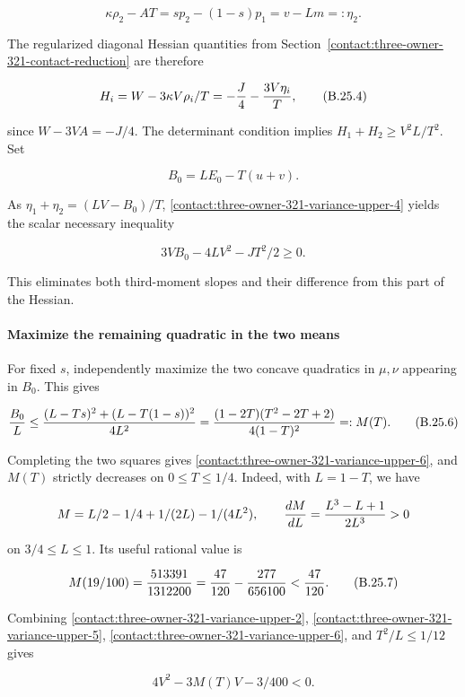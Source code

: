 \[
 \kappa\rho_2-AT=s p_2-(1-s)p_1=v-Lm=:\eta_2.
\tag{B.25.3}\label{contact:three-owner-321-variance-upper-3}
\]

The regularized diagonal Hessian quantities from
Section~\ref{contact:three-owner-321-contact-reduction}
are therefore

\[
 H_i=W-3\kappa V\rho_i/T
     =-{J\over4}-{3V\eta_i\over T},
\tag{B.25.4}\label{contact:three-owner-321-variance-upper-4}
\]

since $W-3VA=-J/4$. The determinant condition implies
$H_1+H_2\ge V^2L/T^2$. Set

\[
 B_0=LE_0-T(u+v).
\]

As $\eta_1+\eta_2=(LV-B_0)/T$, \eqref{contact:three-owner-321-variance-upper-4} yields the scalar necessary inequality

\[
 \boxed{3VB_0-4LV^2-JT^2/2\ge0.}
\tag{B.25.5}\label{contact:three-owner-321-variance-upper-5}
\]

This eliminates both third-moment slopes and their difference from this part of
the Hessian.

\paragraph{Maximize the remaining quadratic in the two means}

For fixed $s$, independently maximize the two concave quadratics in
$\mu,\nu$ appearing in $B_0$. This gives

\[
 {B_0\over L}\le
 { (L-Ts)^2+(L-T(1-s))^2\over4L^2}
 ={(1-2T)(T^2-2T+2)\over4(1-T)^2}=:M(T).
\tag{B.25.6}\label{contact:three-owner-321-variance-upper-6}
\]

Completing the two squares gives \eqref{contact:three-owner-321-variance-upper-6}, and
$M(T)$ strictly decreases on $0\le T\le 1/4$. Indeed, with
$L=1-T$, we have

\[
 M=L/2-1/4+1/(2L)-1/(4L^2),\qquad
 {dM\over dL}={L^3-L+1\over2L^3}>0
\]

on $3/4\le L\le 1$. Its useful rational value is

\[
 M(19/100)={513391\over1312200}
 ={47\over120}-{277\over656100}<{47\over120}.
\tag{B.25.7}\label{contact:three-owner-321-variance-upper-7}
\]

Combining \eqref{contact:three-owner-321-variance-upper-2}, \eqref{contact:three-owner-321-variance-upper-5}, \eqref{contact:three-owner-321-variance-upper-6}, and $T^2/L\le 1/12$ gives

\[
 4V^2-3M(T)V-3/400<0.
\tag{B.25.8}\label{contact:three-owner-321-variance-upper-8}
\]


